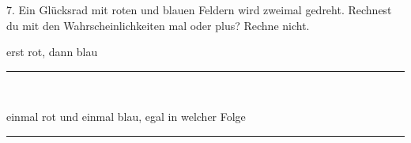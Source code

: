 \documentclass[11pt]{article}
\newcommand{\linie}[1]{\,{\color{black!45}\rule[-1pt]{#1}{0.4pt}}\,}
\begin{document}
\Needspace*{0.16\textheight}
\begin{pfaufg}{}{7.}{}
Ein Glücksrad mit roten und blauen Feldern wird zweimal gedreht. Rechnest du mit den Wahrscheinlichkeiten mal oder plus? Rechne nicht.
\par\smallskip
\par\noindent{}erst rot, dann blau\hfill\linie{30mm}
\par\noindent{}einmal rot und einmal blau, egal in welcher Folge\hfill\linie{30mm}
\par{}
\end{pfaufg}
\end{document}
